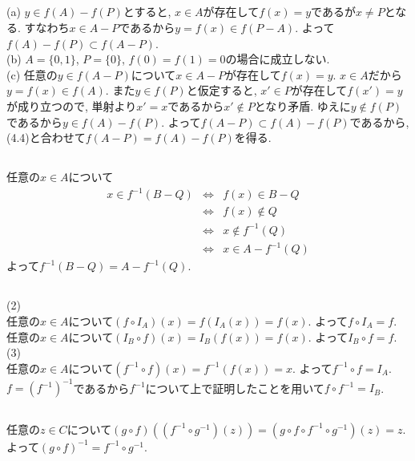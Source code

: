 \documentclass{jsarticle}
\begin{document}
\subsection{} %
\noindent
(a) $y \in f(A) - f(P)$とすると, $x \in A$が存在して$f(x) = y$であるが$x \neq P$となる. すなわち$x \in A - P$であるから$y = f(x) \in f(P - A)$. よって$f(A) - f(P) \subset f(A - P)$.\\
(b) $A = \{0, 1\}$, $P = \{0\}$, $f(0) = f(1) = 0$の場合に成立しない.\\
(c) 任意の$y \in f(A - P)$について$x \in A - P$が存在して$f(x) = y$. $x \in A$だから$y = f(x) \in f(A)$. また$y \in f(P)$と仮定すると, $x' \in P$が存在して$f(x') = y$が成り立つので, 単射より$x' = x$であるから$x' \notin P$となり矛盾. ゆえに$y \notin f(P)$であるから$y \in f(A) - f(P)$. よって$f(A - P) \subset f(A) - f(P)$であるから, (4.4)と合わせて$f(A - P) = f(A) - f(P)$を得る.

\subsection{} %
任意の$x \in A$について
\begin{eqnarray*}
	x \in f^{-1}(B - Q)
	&\Leftrightarrow& f(x) \in B - Q\\
	&\Leftrightarrow& f(x) \notin Q\\
	&\Leftrightarrow& x \notin f^{-1}(Q)\\
	&\Leftrightarrow& x \in A - f^{-1}(Q)
\end{eqnarray*}
よって$f^{-1}(B - Q) = A - f^{-1}(Q)$.

\subsection{} %
\noindent
(2)\\
任意の$x \in A$について$(f \circ I_A)(x) = f(I_A(x)) = f(x)$. よって$f \circ I_A = f$.\\
任意の$x \in A$について$(I_B \circ f)(x) = I_B(f(x)) = f(x)$. よって$I_B \circ f = f$.\\
(3)\\
任意の$x \in A$について$(f^{-1} \circ f)(x) = f^{-1}(f(x)) = x$. よって$f^{-1} \circ f = I_A$.\\
$f = (f^{-1})^{-1}$であるから$f^{-1}$について上で証明したことを用いて$f \circ f^{-1} = I_B$.

\subsection{} %
任意の$z \in C$について$(g \circ f)((f^{-1} \circ g^{-1})(z)) = (g \circ f \circ f^{-1} \circ g^{-1})(z) = z$. よって$(g \circ f)^{-1} = f^{-1} \circ g^{-1}$.
\end{document}
